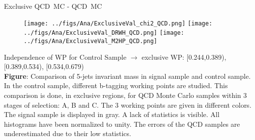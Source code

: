 \begin{frame}{Exclusive QCD~MC - QCD~MC}
\vspace{-.2cm}
\begin{figure}[!Hhtbp]
  \begin{center}
    \texttt{[image: ../figs/Ana/ExclusiveVal\_chi2\_QCD.png]}
    \texttt{[image: ../figs/Ana/ExclusiveVal\_DRWH\_QCD.png]}
    \texttt{[image: ../figs/Ana/ExclusiveVal\_M2HP\_QCD.png]}
  \end{center}
\end{figure}

\vspace{-.2cm}
    \begin{block}{}\tiny
      Independence of WP for Control Sample $\to$ exclusive WP: [0.244,0.389), [0.389,0.534), [0.534,0.679)\\
      \textbf{Figure}: Comparison of 5-jets invariant mass in signal sample and control sample. In the control sample, different b-tagging working points are studied. This comparison is done, in exclusive regions, for QCD Monte Carlo samples within 3 stages of selection: A, B and C. The 3 working points are given in different colors. The signal sample is displayed in gray. A lack of statistics is visible. All histograms have been normalized to unity. The errors of the QCD samples are underestimated due to their low statistics.
    \end{block}

\end{frame}

